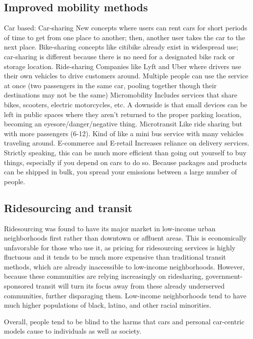 \documentclass{article}
\begin{document}
    \subsection{Improved mobility methods}
    \begin{outline}
        \1 Car based:
            \2 Car-sharing
                \3 New concepts where users can rent cars for short periods of time to get from one place to another; then, another user takes the car to the next place. 
                \3 Bike-sharing concepts like citibike already exist in widespread use; car-sharing is different because there is no need for a designated bike rack or storage location. 
            \2 Ride-sharing 
                \3 Companies like Lyft and Uber where drivers use their own vehicles to drive customers around. 
                \3 Multiple people can use the service at once (two passengers in the same car, pooling together though their destinations may not be the same)
        \1 Micromobility
            \2 Includes services that share bikes, scooters, electric motorcycles, etc. 
            \2 A downside is that small devices can be left in public spaces where they aren't returned to the proper parking location, becoming an eyesore/danger/negative thing. 
        \1 Microtransit
            \2 Like ride sharing but with more passengers (6-12). Kind of like a mini bus service with many vehicles traveling around. 
        \1 E-commerce and E-retail
            \2 Increases reliance on delivery services. Strictly speaking, this can be much more efficient than going out yourself to buy things, especially if you depend on cars to do so. Because packages and products can be shipped in bulk, you spread your emissions between a large number of people. 

    \end{outline}
    \subsection{Ridesourcing and transit}
    \begin{outline}
        \1 Ridesourcing was found to have its major market in low-income urban neighborhoods first rather than downtown or affluent areas. 
        \1 This is economically unfavorable for those who use it, as pricing for ridesourcing services is highly fluctuous and it tends to be much more expensive than traditional transit methods, which are already inaccessible to low-income neighborhoods. 
        \1 However, because these communities are relying increasingly on ridesharing, government-sponsored transit will turn its focus away from these already underserved communities, further disparaging them. 
        \1 Low-income neighborhoods tend to have much higher populations of black, latino, and other racial minorities. 

    \end{outline}
Overall, people tend to be blind to the harms that cars and personal car-centric models cause to individuals as well as society. 
\end{document}

